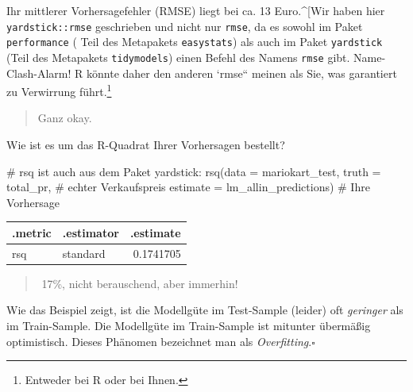\documentclass[
  a4paper,
]{scrbook}
\newenvironment{Shaded}{\begin{snugshade}}{\end{snugshade}}
\newcommand{\AttributeTok}[1]{\textcolor[rgb]{0.40,0.45,0.13}{#1}}
\newcommand{\CommentTok}[1]{\textcolor[rgb]{0.37,0.37,0.37}{#1}}
\newcommand{\FunctionTok}[1]{\textcolor[rgb]{0.28,0.35,0.67}{#1}}
\newcommand{\NormalTok}[1]{\textcolor[rgb]{0.00,0.23,0.31}{#1}}
\theoremstyle{definition}
\theoremstyle{definition}
\theoremstyle{definition}
\theoremstyle{remark}
\begin{document}
Ihr mittlerer Vorhersagefehler (RMSE) liegt bei ca. 13 Euro.\^{}{[}Wir
haben hier \texttt{yardstick::rmse} geschrieben und nicht nur
\texttt{rmse}, da es sowohl im Paket \texttt{performance} ( Teil des
Metapakets \texttt{easystats}) als auch im Paket \texttt{yardstick}
(Teil des Metapakets \texttt{tidymodels}) einen Befehl des Namens
\texttt{rmse} gibt. Name-Clash-Alarm! R könnte daher den anderen `rmse``
meinen als Sie, was garantiert zu Verwirrung führt.\footnote{Entweder
  bei R oder bei Ihnen.}

\begin{quote}
{} Ganz okay.
\end{quote}

Wie ist es um das R-Quadrat Ihrer Vorhersagen bestellt?

\begin{Shaded}
\begin{Highlighting}[]
\CommentTok{\# \textasciigrave{}rsq \textasciigrave{} ist auch aus dem Paket yardstick:}
\FunctionTok{rsq}\NormalTok{(}\AttributeTok{data =}\NormalTok{ mariokart\_test,}
    \AttributeTok{truth =}\NormalTok{ total\_pr,  }\CommentTok{\# echter Verkaufspreis}
    \AttributeTok{estimate =}\NormalTok{ lm\_allin\_predictions)  }\CommentTok{\# Ihre Vorhersage}
\end{Highlighting}
\end{Shaded}

\begin{longtable}[]{@{}llr@{}}
\toprule\noalign{}
.metric & .estimator & .estimate \\
\midrule\noalign{}
\endhead
\bottomrule\noalign{}
\endlastfoot
rsq & standard & 0.1741705 \\
\end{longtable}

\begin{quote}
{}️ 17\%, nicht berauschend, aber immerhin!
\end{quote}

\begin{tcolorbox}[enhanced jigsaw, colbacktitle=quarto-callout-note-color!10!white, bottomrule=.15mm, left=2mm, breakable, rightrule=.15mm, coltitle=black, title=\textcolor{quarto-callout-note-color}{\faInfo}\hspace{0.5em}{Modellgüte im Test-Sample meist geringer als im Train-Sample}, colback=white, leftrule=.75mm, titlerule=0mm, opacityback=0, bottomtitle=1mm, toprule=.15mm, arc=.35mm, toptitle=1mm, opacitybacktitle=0.6, colframe=quarto-callout-note-color-frame]

Wie das Beispiel zeigt, ist die Modellgüte im Test-Sample (leider) oft
\emph{geringer} als im Train-Sample. Die Modellgüte im Train-Sample ist
mitunter übermäßig optimistisch. Dieses Phänomen bezeichnet man als
\emph{Overfitting}.\(\square\)

\end{tcolorbox}
\end{document}
